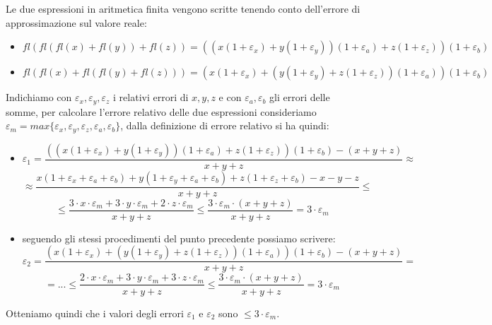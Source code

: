 \begin{flushleft}
Le due espressioni in aritmetica finita vengono scritte tenendo conto dell'errore di approssimazione sul valore reale:
\begin{itemize}
\item $fl(fl(fl(x)+fl(y))+fl(z)) = ((x(1+\varepsilon_{x})+y(1+\varepsilon_{y}))(1+\varepsilon_{a})+z(1+\varepsilon_{z}))(1+\varepsilon_{b})$
\item $fl(fl(x)+fl(fl(y)+fl(z))) = (x(1+\varepsilon_{x})+(y(1+\varepsilon_{y})+z(1+\varepsilon_{z}))(1+\varepsilon_{a}))(1+\varepsilon_{b})$
\end{itemize}
Indichiamo con $\varepsilon_{x},\varepsilon_{y},\varepsilon_{z}$ i relativi errori di $x, y, z$ e con $\varepsilon_{a},\varepsilon_{b}$ gli errori delle somme, per calcolare l'errore relativo delle due espressioni consideriamo $\varepsilon_{m} = max\{\varepsilon_{x},\varepsilon_{y},\varepsilon_{z},\varepsilon_{a},\varepsilon_{b}\}$, dalla definizione di errore relativo si ha quindi:
\begin{itemize}
    \item 
    \[ 
    \varepsilon_{1} = \frac{((x(1+\varepsilon_{x})+y(1+\varepsilon_{y}))(1+\varepsilon_{a})+z(1+\varepsilon_{z}))(1+\varepsilon_{b})-(x+y+z)}{x+y+z} \approx
    \]
    \[
    \approx \frac{x(1+\varepsilon_{x}+\varepsilon_{a}+\varepsilon_{b})+y(1+\varepsilon_{y}+\varepsilon_{a}+\varepsilon_{b})+z(1+\varepsilon_{z}+\varepsilon_{b})-x-y-z}{x+y+z} \leq
    \]
    \[ 
    \leq \frac{3\cdot x\cdot\varepsilon_{m}+ 3\cdot y\cdot\varepsilon_{m} + 2\cdot z\cdot\varepsilon_{m}}{x+y+z} \leq \frac{3\cdot\varepsilon_{m}\cdot(x+y+z)}{x+y+z} = 3\cdot\varepsilon_{m}
    \]
    \item seguendo gli stessi procedimenti del punto precedente possiamo scrivere:
    \[
    \varepsilon_{2} = \frac{(x(1+\varepsilon_{x})+(y(1+\varepsilon_{y})+z(1+\varepsilon_{z}))(1+\varepsilon_{a}))(1+\varepsilon_{b})-(x+y+z)}{x+y+z} = 
    \]
    \[
    = ... \leq \frac{2\cdot x\cdot\varepsilon_{m}+ 3\cdot y\cdot\varepsilon_{m} + 3\cdot z\cdot\varepsilon_{m}}{x+y+z} \leq \frac{3\cdot\varepsilon_{m}\cdot(x+y+z)}{x+y+z} = 3\cdot\varepsilon_{m}
    \]
\end{itemize}

Otteniamo quindi che i valori degli errori $\varepsilon_{1}$ e $\varepsilon_{2}$ sono $\leq 3\cdot\varepsilon_{m}$.
\end{flushleft}